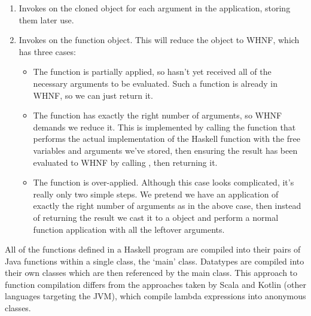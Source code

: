 \documentclass[dissertation.tex]{subfiles}
\begin{document}
{{{\begin{enumerate}
{                Cloning the function essentially maintains the same references to arguments and free variables, but creates new (non-shared) containers to hold them, avoiding the above issue.
                
                This is a shallow clone -- if we used a deep clone, recursively cloning the arguments and free variables, then we'd lose the performance benefit of graph reduction where we can use an already computed value instead of recomputing it ourselves, and increase memory usage. 
            }
            \item
            {
                Invokes  on the cloned object for each argument in the application, storing them later use.
            }
            \item
            {
                Invokes  on the function object. This will reduce the object to WHNF, which has three cases:

                \begin{itemize}
                \item
                {
                    The function is partially applied, so hasn't yet received all of the necessary arguments to be evaluated. Such a function is already in WHNF, so we can just return it.
                }
                \item
                {
                    The function has exactly the right number of arguments, so WHNF demands we reduce it. This is implemented by calling the  function that performs the actual implementation of the Haskell function with the free variables and arguments we've stored, then ensuring the result has been evaluated to WHNF by calling , then returning it.
                }
                \item
                {
                    The function is over-applied. Although this case looks complicated, it's really only two simple steps. We pretend we have an application of exactly the right number of arguments as in the above case, then instead of returning the result we cast it to a  object and perform a normal function application with all the leftover arguments.
                }
                \end{itemize}
            }
            \end{enumerate}

            All of the functions defined in a Haskell program are compiled into their pairs of Java functions within a single class, the `main' class. Datatypes are compiled into their own classes which are then referenced by the main class. This approach to function compilation differs from the approaches taken by Scala and Kotlin (other languages targeting the JVM), which compile lambda expressions into anonymous classes.

}}}
\end{document}
